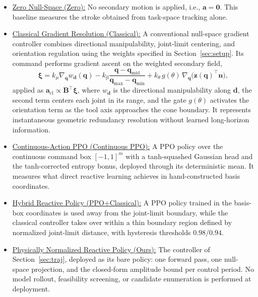 \documentclass[journal, twoside]{IEEEtran}
\begin{document}
\begin{itemize}[leftmargin=1em]
\renewcommand{\labelitemi}{$\triangleright$}

    \item \uline{Zero Null-Space (Zero):}
    No secondary motion is applied, i.e.,
    $\mathbf{a}=\mathbf{0}$. This baseline measures the stroke obtained from
    task-space tracking alone.

    \item \uline{Classical Gradient Resolution (Classical):}
    A conventional null-space gradient controller combines directional
    manipulability, joint-limit centering, and orientation regulation using
    the weights specified in Section~\ref{sec:setup}. Its command performs
    gradient ascent on the weighted secondary field,
    \begin{equation}
    \label{eq:secondary}
    \boldsymbol{\xi}
    = k_{\mu}\nabla_{\mathbf{q}} w_{\mathbf{d}}(\mathbf{q})
    - k_{\mathrm{jl}}
    \frac{\mathbf{q}-\mathbf{q}_{\mathrm{mid}}}
         {\mathbf{q}_{\max}-\mathbf{q}_{\min}}
    + k_{\theta}\, g(\theta)\,
    \nabla_{\mathbf{q}}\!\bigl(\mathbf{z}(\mathbf{q})^{\top}\mathbf{n}\bigr),
    \end{equation}
    applied as $\mathbf{a}_{\mathrm{cl}} \propto
    \mathbf{B}^{\top}\boldsymbol{\xi}$, where $w_{\mathbf{d}}$ is the
    directional manipulability along $\mathbf{d}$, the second term centers
    each joint in its range, and the gate $g(\theta)$ activates the
    orientation term as the tool axis approaches the cone boundary. It
    represents instantaneous geometric redundancy resolution without
    learned long-horizon information.

    \item \uline{Continuous-Action PPO (Continuous PPO):}
    A PPO policy over the continuous command box $[-1,1]^{m}$ with a
    tanh-squashed Gaussian head and the tanh-corrected entropy bonus,
    deployed through its deterministic mean. It measures what direct
    reactive learning achieves in hand-constructed basis coordinates.

    \item \uline{Hybrid Reactive Policy (PPO+Classical):}
    A PPO policy trained in the basis-box coordinates is
    used away from the joint-limit boundary, while the classical
    controller takes over within a thin boundary region defined by
    normalized joint-limit distance, with hysteresis thresholds
    $0.98/0.94$.

    \item \uline{Physically Normalized Reactive Policy (Ours):}
    The controller of Section~\ref{sec:traj}, deployed as its bare
    policy: one forward pass, one null-space projection, and the
    closed-form amplitude bound per control period. No model rollout,
    feasibility screening, or candidate enumeration is performed at
    deployment.
\end{itemize}
\end{document}
